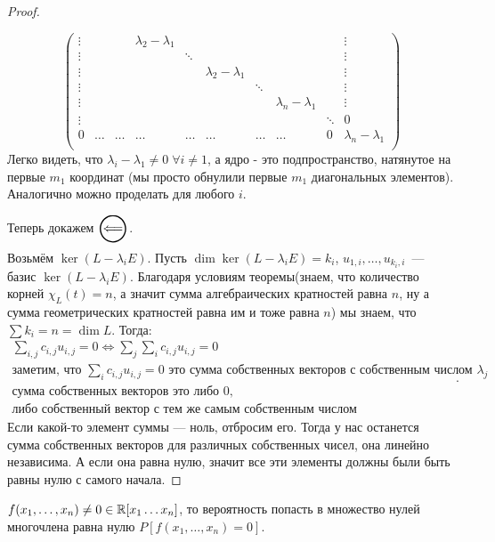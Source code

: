 \begin{proof}
\begin{enumerate}
\[\begin{pmatrix}
                \vdots & & & \lambda_2 - \lambda_1 & & & & & & \vdots\\
                \vdots & & & & \ddots & & & & & \vdots\\
                \vdots & & & & & \lambda_2 - \lambda_1 & & & & \vdots\\
                \vdots & & & & & & \ddots & & & \vdots\\
                \vdots & & & & & & & \lambda_n - \lambda_1 & & \vdots\\
                \vdots & & & & & & & & \ddots & 0\\
                0 & \dots & \dots & \dots & \dots & \dots & \dots & \dots & 0 & \lambda_n - \lambda_1 \\
              \end{pmatrix}
            \]
            Легко видеть, что $\lambda_i - \lambda_1 \neq 0 \; \forall i \neq 1$, а ядро - это подпространство, натянутое на первые $m_1$ координат (мы просто обнулили первые $m_1$ диагональных элементов). Аналогично можно проделать для любого $i$.
    \end{enumerate}
    Теперь докажем $\ola$.
    
    Возьмём $\ker(L - \lambda_i E)$. Пусть $\dim \ker (L - \lambda_i E) = k_i$, $u_{1,i},\dots,u_{k_i,i}$~--- базис $\ker(L - \lambda_i E)$. 
    Благодаря условиям теоремы(знаем, что количество корней
    $\chi_L(t) = n$, а значит сумма алгебраических кратностей равна $n$, ну а сумма 
    геометрических кратностей равна им и тоже равна $n$) мы знаем, что $\sum k_i = n = \dim L$.
    Тогда: 
    \[
        \begin{gathered}
            \sum\limits_{i,j}c_{i,j}u_{i,j} = 0 \Leftrightarrow
            \sum\limits_{j}\sum\limits_{i}c_{i,j}u_{i,j} = 0\\
            \text{заметим, что } \sum\limits_{i}c_{i,j}u_{i,j} = 0 \text{ это сумма собственных векторов с собственным числом } \lambda_j \\
            \text{сумма собственных векторов это либо } 0,\\ \text{либо собственный вектор с  тем же самым собственным числом}
        \end{gathered}
    .\] 
    Если какой-то элемент суммы --- ноль, отбросим его. Тогда у нас останется  сумма собственных векторов для различных собственных чисел, она линейно независима. А если она равна нулю, значит все эти элементы должны были быть равны нулю с самого начала.
\end{proof}
\begin{remark}
    $f(x_1,\dots, x_n)\not= 0\in \mathbb{R}[x_1\dots x_n]$, то вероятность попасть в множество нулей многочлена равна нулю
    $P[f(x_1,\dots, x_n) = 0]$.
\end{remark}
